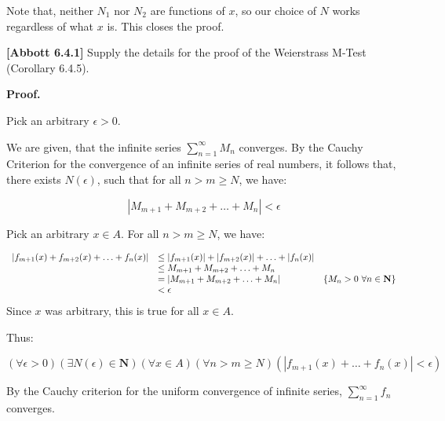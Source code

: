 \documentclass[10pt]{article}
\begin{document}
Note that, neither $N_{1}$ nor $N_{2}$ are functions of $x$, so our choice of $N$ works regardless of what $x$ is. This closes the proof. 



\textbf{[Abbott 6.4.1]} Supply the details for the proof of the Weierstrass M-Test (Corollary 6.4.5). 



\textbf{Proof.}



Pick an arbitrary $\displaystyle \epsilon  >0$. 



We are given, that the infinite series $\displaystyle \sum _{n=1}^{\infty } M_{n}$ converges. By the Cauchy Criterion for the convergence of an infinite series of real numbers, it follows that, there exists $\displaystyle N( \epsilon )$, such that for all $\displaystyle n >m\geq N$, we have:


\begin{equation*}
|M_{m+1} +M_{m+2} +\dotsc +M_{n} |< \epsilon 
\end{equation*}


Pick an arbitrary $\displaystyle x\in A$. For all $\displaystyle n >m\geq N$, we have:


\begin{equation*}
\begin{array}{ c l c }
|f_{m+1}( x) +f_{m+2}( x) +\dotsc +f_{n}( x) | & \leq |f_{m+1}( x) |+|f_{m+2}( x) |+\dotsc +|f_{n}( x) | & \\
 & \leq M_{m+1} +M_{m+2} +\dotsc +M_{n} & \\
 & =|M_{m+1} +M_{m+2} +\dotsc +M_{n} | & \{M_{n}  >0\ \forall n\in \mathbf{N}\}\\
 & < \epsilon  & 
\end{array}
\end{equation*}
Since $\displaystyle x$ was arbitrary, this is true for all $\displaystyle x\in A$. 



Thus:


\begin{equation*}
( \forall \epsilon  >0)( \exists N( \epsilon ) \in \mathbf{N})( \forall x\in A)( \forall n >m\geq N)( |f_{m+1}( x) +\dotsc +f_{n}( x) |< \epsilon )
\end{equation*}


By the Cauchy criterion for the uniform convergence of infinite series, $\displaystyle \sum _{n=1}^{\infty } f_{n}$ converges.
\end{document}
